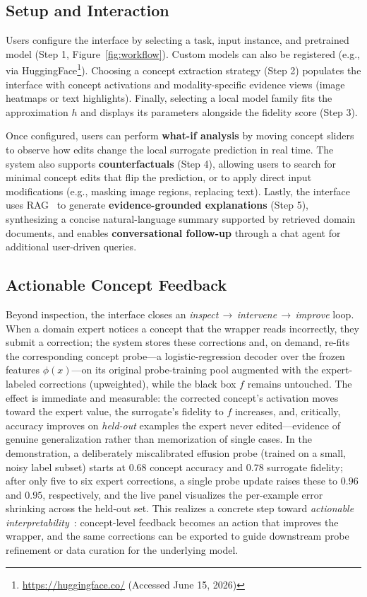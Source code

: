 \documentclass[sigconf,review,screen]{acmart}
\begin{document}
\subsection{Setup and Interaction}
Users configure the interface by selecting a task, input instance, and pretrained model (Step 1, Figure~\ref{fig:workflow}). Custom models can also be registered (e.g., via HuggingFace\footnote{\url{https://huggingface.co/} (Accessed June 15, 2026)}). Choosing a concept extraction strategy (Step 2) populates the interface with concept activations and modality-specific evidence views (image heatmaps or text highlights). Finally, selecting a local model family fits the approximation $h$ and displays its parameters alongside the fidelity score (Step 3).

Once configured, users can perform \textbf{what-if analysis} by moving concept sliders to observe how edits change the local surrogate prediction in real time. The system also supports \textbf{counterfactuals} (Step 4), allowing users to search for minimal concept edits that flip the prediction, or to apply direct input modifications (e.g., masking image regions, replacing text). Lastly, the interface uses RAG~\cite{Lewis2020RAG} to generate \textbf{evidence-grounded explanations} (Step 5), synthesizing a concise natural-language summary supported by retrieved domain documents, and enables \textbf{conversational follow-up} through a chat agent for additional user-driven queries.

\subsection{Actionable Concept Feedback}
Beyond inspection, the interface closes an \emph{inspect\,$\rightarrow$\,intervene\,$\rightarrow$\,improve} loop. When a domain expert notices a concept that the wrapper reads incorrectly, they submit a correction; the system stores these corrections and, on demand, re-fits the corresponding concept probe---a logistic-regression decoder over the frozen features $\phi(x)$---on its original probe-training pool augmented with the expert-labeled corrections (upweighted), while the black box $f$ remains untouched. The effect is immediate and measurable: the corrected concept's activation moves toward the expert value, the surrogate's fidelity to $f$ increases, and, critically, accuracy improves on \emph{held-out} examples the expert never edited---evidence of genuine generalization rather than memorization of single cases. In the demonstration, a deliberately miscalibrated effusion probe (trained on a small, noisy label subset) starts at $0.68$ concept accuracy and $0.78$ surrogate fidelity; after only five to six expert corrections, a single probe update raises these to $0.96$ and $0.95$, respectively, and the live panel visualizes the per-example error shrinking across the held-out set. This realizes a concrete step toward \emph{actionable interpretability}~\cite{Orgad2026Actionable}: concept-level feedback becomes an action that improves the wrapper, and the same corrections can be exported to guide downstream probe refinement or data curation for the underlying model.
\end{document}
